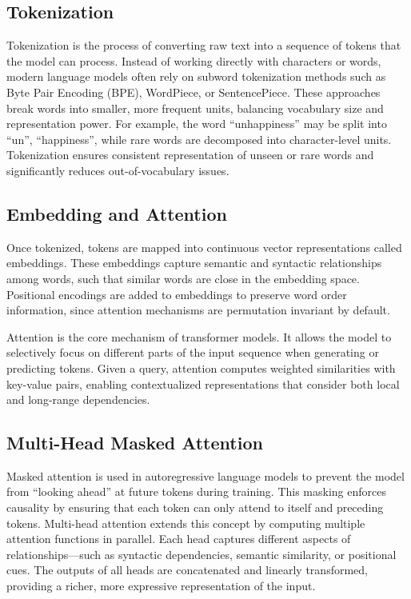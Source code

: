 \subsection{Tokenization}
Tokenization is the process of converting raw text into a sequence of tokens that the model can process. Instead of working directly with characters or words, modern language models often rely on subword tokenization methods such as Byte Pair Encoding (BPE), WordPiece, or SentencePiece. These approaches break words into smaller, more frequent units, balancing vocabulary size and representation power. For example, the word ``unhappiness'' may be split into ``un'', ``happiness'', while rare words are decomposed into character-level units. Tokenization ensures consistent representation of unseen or rare words and significantly reduces out-of-vocabulary issues.

\subsection{Embedding and Attention}
Once tokenized, tokens are mapped into continuous vector representations called embeddings. These embeddings capture semantic and syntactic relationships among words, such that similar words are close in the embedding space. Positional encodings are added to embeddings to preserve word order information, since attention mechanisms are permutation invariant by default.

Attention is the core mechanism of transformer models. It allows the model to selectively focus on different parts of the input sequence when generating or predicting tokens. Given a query, attention computes weighted similarities with key-value pairs, enabling contextualized representations that consider both local and long-range dependencies.

\subsection{Multi-Head Masked Attention}
Masked attention is used in autoregressive language models to prevent the model from ``looking ahead'' at future tokens during training. This masking enforces causality by ensuring that each token can only attend to itself and preceding tokens. Multi-head attention extends this concept by computing multiple attention functions in parallel. Each head captures different aspects of relationships—such as syntactic dependencies, semantic similarity, or positional cues. The outputs of all heads are concatenated and linearly transformed, providing a richer, more expressive representation of the input.


